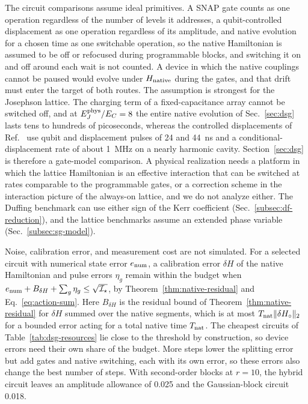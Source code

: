 \documentclass[pra,twocolumn,superscriptaddress,nofootinbib,floatfix]{revtex4-2}
\theoremstyle{remark}
\newcommand{\revcolor}{\color{blue}}
\DeclareRobustCommand{\rev}[1]{{\revcolor #1}}
\begin{document}
\rev{The circuit comparisons assume ideal primitives.} \rev{A SNAP gate counts as one operation regardless of the number of levels it addresses, a qubit-controlled displacement as one operation regardless of its amplitude, and native evolution for a chosen time as one switchable operation, so the native Hamiltonian is assumed to be off or refocused during programmable blocks, and switching it on and off around each wait is not counted.} \rev{A device in which the native couplings cannot be paused would evolve under \(H_{\rm native}\) during the gates, and that drift must enter the target of both routes.} \rev{The assumption is strongest for the Josephson lattice.} \rev{The charging term of a fixed-capacitance array cannot be switched off, and at \(E_J^{\rm phys}/E_C=8\) the entire native evolution of Sec.~\ref{sec:dsg} lasts tens to hundreds of picoseconds, whereas the controlled displacements of Ref.~\cite{Eickbusch2022ECD} use qubit and displacement pulses of 24 and 44~ns and a conditional-displacement rate of about 1~MHz on a nearly harmonic cavity.} \rev{Section~\ref{sec:dsg} is therefore a gate-model comparison.} \rev{A physical realization needs a platform in which the lattice Hamiltonian is an effective interaction that can be switched at rates comparable to the programmable gates, or a correction scheme in the interaction picture of the always-on lattice, and we do not analyze either.} \rev{The Duffing benchmark can use either sign of the Kerr coefficient (Sec.~\ref{subsec:df-reduction}), and the lattice benchmarks assume an extended phase variable (Sec.~\ref{subsec:sg-model}).}

\rev{Noise, calibration error, and measurement cost are not simulated.} \rev{For a selected circuit with numerical state error \(e_{\rm num}\), a calibration error \(\delta H\) of the native Hamiltonian and pulse errors \(\eta_g\) remain within the budget when \(e_{\rm num}+B_{\delta H}+\sum_g\eta_g\le\sqrt{\mathcal I_\star}\), by Theorem~\ref{thm:native-residual} and Eq.~\eqref{eq:action-sum}.} \rev{Here \(B_{\delta H}\) is the residual bound of Theorem~\ref{thm:native-residual} for \(\delta H\) summed over the native segments, which is at most \(T_{\rm nat}\|\delta H_\circ\|_2\) for a bounded error acting for a total native time \(T_{\rm nat}\).} \rev{The cheapest circuits of Table~\ref{tab:dsg-resources} lie close to the threshold by construction, so device errors need their own share of the budget.} \rev{More steps lower the splitting error but add gates and native switching, each with its own error, so these errors also change the best number of steps.} \rev{With second-order blocks at \(r=10\), the hybrid circuit leaves an amplitude allowance of 0.025 and the Gaussian-block circuit 0.018.}
\end{document}
